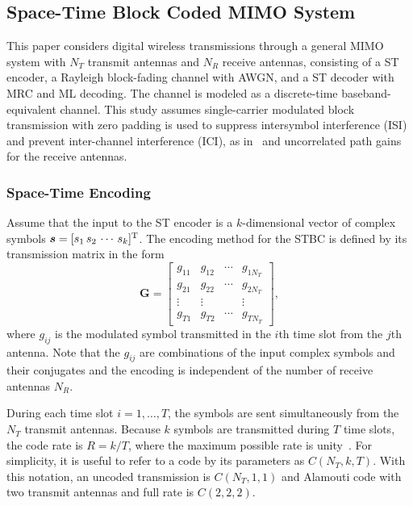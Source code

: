 \subsection{Space-Time Block Coded MIMO System}
This paper considers digital wireless transmissions through a general MIMO system with $N_T$ transmit antennas and $N_R$ receive antennas, consisting of a ST encoder, a Rayleigh block-fading channel with AWGN, and a ST decoder with MRC and ML decoding. The channel is modeled as a discrete-time baseband-equivalent channel. This study assumes single-carrier modulated block transmission with zero padding is used to suppress intersymbol interference (ISI) and prevent inter-channel interference (ICI), as in~\cite{wang00,wang04} and uncorrelated path gains for the receive antennas.

\subsubsection{Space-Time Encoding}
Assume that the input to the ST encoder is a $k$-dimensional vector of complex symbols $\bm{s}=[s_1\,s_2\,\cdots\,s_k]^\text{T}$. The encoding method for the STBC is defined by its transmission matrix in the form 
\[ \bm{G} = \begin{bmatrix}
  g_{11} & g_{12} & \cdots & g_{1N_T} \\
  g_{21} & g_{22} & \cdots & g_{2N_T} \\
  \vdots & \vdots &       & \vdots \\
  g_{T1} & g_{T2} & \cdots & g_{TN_T}
\end{bmatrix}, \]
where $g_{ij}$ is the modulated symbol transmitted in the $i$th time slot from the $j$th antenna. Note that the $g_{ij}$ are combinations of the input complex symbols and their conjugates and the encoding is independent of the number of receive antennas $N_R$.

During each time slot $i=1,\dots,T$, the symbols are sent simultaneously from the $N_T$ transmit antennas. Because $k$ symbols are transmitted during $T$ time slots, the code rate is $R=k/T$, where the maximum possible rate is unity~\cite{tarokh99}. For simplicity, it is useful to refer to a code by its parameters as $C(N_T,k,T)$. With this notation, an uncoded transmission is $C(N_T,1,1)$ and Alamouti code with two transmit antennas and full rate is $C(2,2,2)$.

